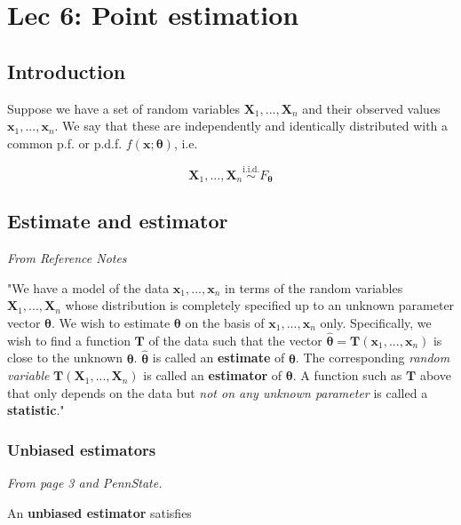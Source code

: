 \chapter[Lec 6: Point estimation]{Lec 6: Point estimation}


\section{Introduction}\label{sec:6intro}

Suppose we have a set of random variables \(\bm{X}_1, ..., \bm{X}_n\) and 
their observed values \(\bm{x}_1, ..., \bm{x}_n\). We say that these are 
independently and identically distributed with a common p.f. or p.d.f. \(f(\bm{x};\bm{\theta})\), 
i.e. 

\[\bm{X}_1, ..., \bm{X}_n \overset{\text{i.i.d.}}{\sim} F_{\bm{\theta}}\]

\section{Estimate and estimator}\label{sec:estimate and estimator}

\textit{From Reference Notes}

"We have a model of the data \(\bm{x}_1, ..., \bm{x}_n\) in terms of the random variables \(\bm{X}_1, ..., \bm{X}_n\) whose distribution is completely specified up to an unknown parameter vector \(\bm{\theta}\). 
We wish to estimate \(\bm{\theta}\) on the basis of \(\bm{x}_1, ..., \bm{x}_n\) only. 
Specifically, we wish to find a function \(\bm{T}\) of the data such that the vector \(\hat{\bm{\theta}} = \bm{T}(\bm{x}_1, ..., \bm{x}_n)\) is close to the unknown \(\bm{\theta}\). 
\(\hat{\bm{\theta}}\) is called an \textbf{estimate} of \(\bm{\theta}\). 
The corresponding \textit{random variable} \(\bm{T}(\bm{X}_1, ..., \bm{X}_n)\) is called an \textbf{estimator} of \(\bm{\theta}\). 
A function such as \(\bm{T}\) above that only depends on the data but \textit{not on any unknown parameter} is called a \textbf{statistic}."\autocite{reference}

\bigskip



\subsection{Unbiased estimators}\label{sec:unbiased ests}

\textit{From page 3 and PennState. \autocite{penn415}}

An \textbf{unbiased estimator} satisfies 

